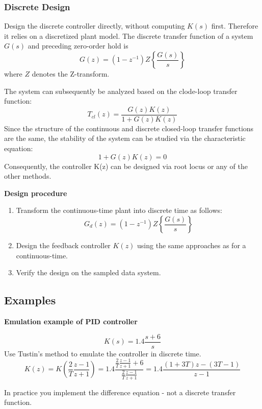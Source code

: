 \subsubsection{Discrete Design}
Design the discrete controller directly, without computing $K(s)$ first.
Therefore it relies on a discretized plant model. The discrete transfer function of a system $G(s)$ and preceding
zero-order hold is
$$G(z) = (1-z^{-1}) Z  \left\{\frac{G(s)}{s}\right\}$$
where $Z$ denotes the Z-transform.

The system can subsequently be analyzed based on the clode-loop transfer function:
$$T_{cl}(z)=\frac{G(z)K(z)}{1+G(z)K(z)}$$
Since the structure of the continuous and discrete closed-loop transfer functions are the same, the stability of the system can be studied via the characteristic equation:
$$1+G(z)K(z)=0$$
Consequently, the controller K(z) can be designed via root locus or any of the other methods.

\textbf{Design procedure}
\begin{enumerate}
	\item Transform the continuous-time plant into discrete time as follows:
	      $$G_d(z) = (1-z^{-1}) Z  \left\{\frac{G(s)}{s}\right\}$$
	\item Design the feedback controller $K(z)$ using the same approaches as for a continuous-time.
	\item Verify the design on the sampled data system.
\end{enumerate}

\subsection{Examples}

\textbf{Emulation example of PID controller}

$$K(s) = 1.4 \frac{s+6}{s}$$
Use Tustin's method to emulate the controller in discrete time.
$$K(z) = K(\frac{2}{T} \frac{z-1}{z+1}) = 1.4 \frac{\frac{2}{T} \frac{z-1}{z+1}+6}{\frac{2}{T} \frac{z-1}{z+1}}
	= 1.4 \frac{(1+3T)z-(3T-1)}{z-1}$$

In practice you implement the difference equation - not a discrete transfer function.
